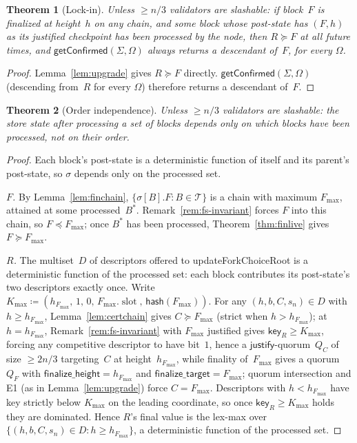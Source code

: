 \ifx\litemode\undefined\documentclass{article}\fi
\newcommand{\T}[0]{\ensuremath{\mathcal{T}}}
\newcommand{\slot}[0]{\ensuremath{\operatorname{\mathrm{slot}}}}
\newcommand{\just}{\ensuremath{\mathsf{justify}}\xspace}
\newcommand{\finalizeHeight}{\mathsf{finalize\_height}}
\newcommand{\finalizeTarget}{\mathsf{finalize\_target}}
\newcommand{\hash}{\mathsf{hash}}
\newcommand{\key}{\mathsf{key}}
\newcommand{\updateForkChoiceRoot}{\textsf{updateForkChoiceRoot}\xspace}
\newcommand{\getConfirmed}{\textsf{getConfirmed}\xspace}
\theoremstyle{plain}
\newtheorem{theorem}{Theorem}
\theoremstyle{definition}
\theoremstyle{remark}
\begin{document}
\begin{theorem}[Lock-in]\label{thm:lockin}
Unless $\geq n/3$ validators are slashable: if block~$F$ is finalized at height~$h$ on any chain, and some block whose post-state has $(F, h)$ as its justified checkpoint has been processed by the node, then $R \succeq F$ at all future times, and $\getConfirmed(\Sigma, \Omega)$ always returns a descendant of~$F$, for every $\Omega$.
\end{theorem}

\begin{proof}
Lemma~\ref{lem:upgrade} gives $R \succeq F$ directly.
$\getConfirmed(\Sigma, \Omega)$ (descending from~$R$ for every $\Omega$) therefore returns a descendant of~$F$.
\end{proof}

\begin{theorem}[Order independence]\label{thm:orderindep}
Unless $\geq n/3$ validators are slashable: the store state after processing a set of blocks depends only on which blocks have been processed, not on their order.
\end{theorem}

\begin{proof}
Each block's post-state is a deterministic function of itself and its parent's post-state, so $\sigma$ depends only on the processed set.

\emph{$F$.} By Lemma~\ref{lem:finchain}, $\{\sigma[B].F : B \in \T\}$ is a chain with maximum $F_{\max}$, attained at some processed~$B^\ast$.
Remark~\ref{rem:fs-invariant} forces $F$ into this chain, so $F \preceq F_{\max}$; once $B^\ast$ has been processed, Theorem~\ref{thm:finlive} gives $F \succeq F_{\max}$.

\emph{$R$.} The multiset~$D$ of descriptors offered to \updateForkChoiceRoot is a deterministic function of the processed set: each block contributes its post-state's two descriptors exactly once.
Write $K_{\max} \coloneqq (h_{F_{\max}},\, 1,\, 0,\, F_{\max}.\slot,\, \hash(F_{\max}))$.
For any $(h, b, C, s_n) \in D$ with $h \geq h_{F_{\max}}$, Lemma~\ref{lem:certchain} gives $C \succeq F_{\max}$ (strict when $h > h_{F_{\max}}$); at $h = h_{F_{\max}}$, Remark~\ref{rem:fs-invariant} with $F_{\max}$ justified gives $\key_R \geq K_{\max}$, forcing any competitive descriptor to have bit~$1$, hence a \just-quorum~$Q_C$ of size $\geq 2n/3$ targeting~$C$ at height~$h_{F_{\max}}$, while finality of~$F_{\max}$ gives a quorum~$Q_F$ with $\finalizeHeight = h_{F_{\max}}$ and $\finalizeTarget = F_{\max}$; quorum intersection and E1 (as in Lemma~\ref{lem:upgrade}) force $C = F_{\max}$.
Descriptors with $h < h_{F_{\max}}$ have key strictly below $K_{\max}$ on the leading coordinate, so once $\key_R \geq K_{\max}$ holds they are dominated.
Hence $R$'s final value is the lex-max over $\{(h, b, C, s_n) \in D : h \geq h_{F_{\max}}\}$, a deterministic function of the processed set.
\end{proof}
\end{document}
